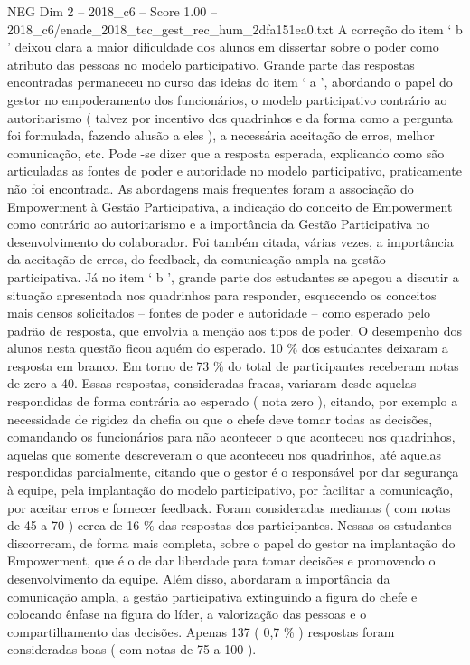 \begin{textsample}{NEG Dim 2 – 2018\_c6 – Score 1.00 – 2018\_c6/enade\_2018\_tec\_gest\_rec\_hum\_2dfa151ea0.txt}
A correção do item ‘ b ’ deixou clara a maior dificuldade dos alunos em dissertar sobre o poder como atributo das pessoas no modelo participativo.
Grande parte das respostas encontradas permaneceu no curso das ideias do item ‘ a ’, abordando o papel do gestor no empoderamento dos funcionários, o modelo participativo contrário ao autoritarismo ( talvez por incentivo dos quadrinhos e da forma como a pergunta foi formulada, fazendo alusão a eles ), a necessária aceitação de erros, melhor comunicação, etc.
Pode -se dizer que a resposta esperada, explicando como são articuladas as fontes de poder e autoridade no modelo participativo, praticamente não foi encontrada.
As abordagens mais frequentes foram a associação do Empowerment à Gestão Participativa, a indicação do conceito de Empowerment como contrário ao autoritarismo e a importância da Gestão Participativa no desenvolvimento do colaborador.
Foi também citada, várias vezes, a importância da aceitação de erros, do feedback, da comunicação ampla na gestão participativa.
Já no item ‘ b ’, grande parte dos estudantes se apegou a discutir a situação apresentada nos quadrinhos para responder, esquecendo os conceitos mais densos solicitados – fontes de poder e autoridade – como esperado pelo padrão de resposta, que envolvia a menção aos tipos de poder.
O desempenho dos alunos nesta questão ficou aquém do esperado. 10 \% dos estudantes deixaram a resposta em branco.
Em torno de 73 \% do total de participantes receberam notas de zero a 40.
Essas respostas, consideradas fracas, variaram desde aquelas respondidas de forma contrária ao esperado ( nota zero ), citando, por exemplo a necessidade de rigidez da chefia ou que o chefe deve tomar todas as decisões, comandando os funcionários para não acontecer o que aconteceu nos quadrinhos, aquelas que somente descreveram o que aconteceu nos quadrinhos, até aquelas respondidas parcialmente, citando que o gestor é o responsável por dar segurança à equipe, pela implantação do modelo participativo, por facilitar a comunicação, por aceitar erros e fornecer feedback.
Foram consideradas medianas ( com notas de 45 a 70 ) cerca de 16 \% das respostas dos participantes.
Nessas os estudantes discorreram, de forma mais completa, sobre o papel do gestor na implantação do Empowerment, que é o de dar liberdade para tomar decisões e promovendo o desenvolvimento da equipe.
Além disso, abordaram a importância da comunicação ampla, a gestão participativa extinguindo a figura do chefe e colocando ênfase na figura do líder, a valorização das pessoas e o compartilhamento das decisões.
Apenas 137 ( 0,7 \% ) respostas foram consideradas boas ( com notas de 75 a 100 ).

\end{textsample}
